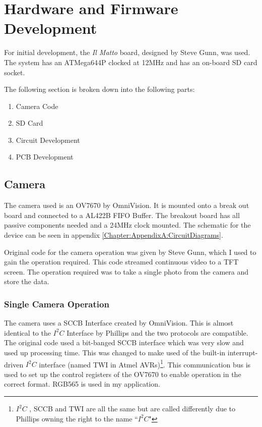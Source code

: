 \chapter{Hardware and Firmware Development} \label{Chapter:HardwareDevelopment}
For initial development, the \textit{Il Matto} board, designed by Steve Gunn, was used. The system has an ATMega644P clocked at 12MHz and has an on-board SD card socket. 

The following section is broken down into the following parts:
\begin{enumerate}
\item Camera Code
\item SD Card
\item Circuit Development
\item PCB Development
\end{enumerate}

\section{Camera} \label{Section:Camera}

The camera used is an OV7670 by OmniVision. It is mounted onto a break out board and connected to a AL422B FIFO Buffer. The breakout board has all passive components needed and a 24MHz clock mounted. The schematic for the device can be seen in appendix \ref{Chapter:AppendixA:CircuitDiagrams}.

Original code for the camera operation was given by Steve Gunn, which I used to gain the operation required. This code streamed continuous video to a TFT screen. The operation required was to take a single photo from the camera and store the data. 

\subsection{Single Camera Operation}

The camera uses a SCCB Interface \citep{SCCB_Interface} created by OmniVision. This is almost identical to the $I^{2}C$ Interface by Phillips and the two protocols are compatible. The original code used a bit-banged SCCB interface which was very slow and used up processing time. This was changed to make used of the built-in interrupt-driven $I^{2}C$ interface (named TWI in Atmel AVRs)\footnote{$I^{2}C$ , SCCB and TWI are all the same but are called differently due to Phillips owning the right to the name ``$I^{2}C$"}. This communication bus is used to set up the control registers of the OV7670 to enable operation in the correct format. RGB565 is used in my application.

